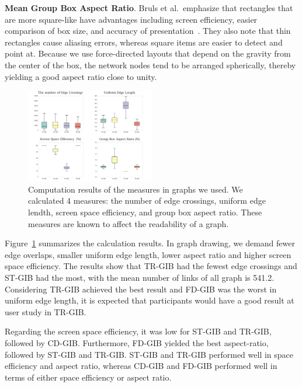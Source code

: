 \documentclass[review]{vgtc}                 %
\begin{document}
{\bf Mean Group Box Aspect Ratio}.
Bruls et al.\ emphasize that rectangles that are more square-like have advantages including screen efficiency, easier comparison of box size, and accuracy of presentation~\cite{bruls2000squarified}.
They also note that thin rectangles cause aliasing errors, whereas square items are easier to detect and point at.
Because we use force-directed layouts that depend on the gravity from the center of the box, the network nodes tend to be arranged spherically, thereby yielding a good aspect ratio close to unity.

\begin{figure}[t]
  \begin{center}
    \includegraphics[width=0.5\textwidth]{pictures/computation.png}
    \caption{Computation results of the measures in graphs we used. We calculated 4 measures: the number of edge crossings, uniform edge lendth, screen space efficiency, and group box aspect ratio. These measures are known to affect the readability of a graph.}
    \label{comp-result}
  \end{center}
\end{figure}

Figure~\ref{comp-result} summarizes the calculation results.
In graph drawing, we demand fewer edge overlaps, smaller uniform edge length, lower aspect ratio and higher screen space efficiency.
The results show that TR-GIB had the fewest edge crossings and ST-GIB had the most, with the mean number of links of all graph is 541.2.
Considering TR-GIB achieved the best result and FD-GIB was the worst in uniform edge length, it is expected that participants would have a good result at user study in TR-GIB.


Regarding the screen space efficiency, it was low for ST-GIB and TR-GIB, followed by CD-GIB.
Furthermore, FD-GIB yielded the best aspect-ratio, followed by ST-GIB and TR-GIB.
ST-GIB and TR-GIB performed well in space efficiency and aspect ratio, whereas CD-GIB and FD-GIB performed well in terms of either space efficiency or aspect ratio.
\end{document}
